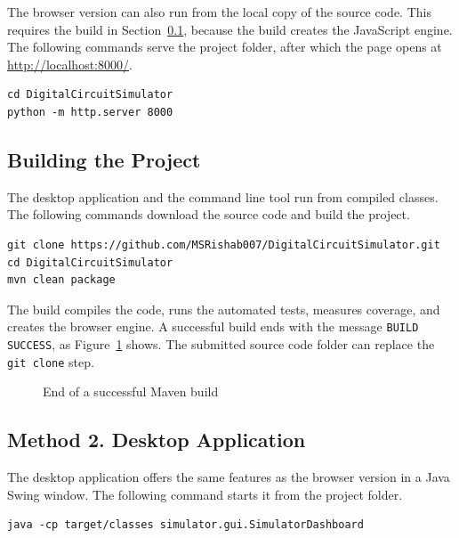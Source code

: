 The browser version can also run from the local copy of the source code.
This requires the build in Section~\ref{sec:build}, because the build creates the JavaScript engine.
The following commands serve the project folder, after which the page opens at \url{http://localhost:8000/}.

\begin{lstlisting}
cd DigitalCircuitSimulator
python -m http.server 8000
\end{lstlisting}

\subsection{Building the Project}
\label{sec:build}

The desktop application and the command line tool run from compiled classes.
The following commands download the source code and build the project.

\begin{lstlisting}
git clone https://github.com/MSRishab007/DigitalCircuitSimulator.git
cd DigitalCircuitSimulator
mvn clean package
\end{lstlisting}

The build compiles the code, runs the automated tests, measures coverage, and creates the browser engine.
A successful build ends with the message \texttt{BUILD SUCCESS}, as Figure~\ref{fig:build} shows.
The submitted source code folder can replace the \texttt{git clone} step.

\begin{figure}[H]
\centering
{}
\caption{End of a successful Maven build}
\label{fig:build}
\end{figure}

\subsection{Method 2. Desktop Application}
\label{sec:desktop}

The desktop application offers the same features as the browser version in a Java Swing window.
The following command starts it from the project folder.

\begin{lstlisting}
java -cp target/classes simulator.gui.SimulatorDashboard
\end{lstlisting}

